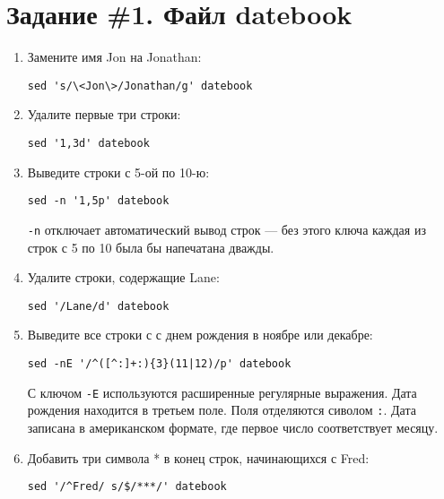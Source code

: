 \documentclass[listings]{labreport}
\begin{document}
\maketitlepage

\section*{Задание \#1. Файл datebook}

\begin{enumerate}
\item Замените имя Jon на Jonathan:
\begin{verbatim}
sed 's/\<Jon\>/Jonathan/g' datebook
\end{verbatim}

\item Удалите первые три строки:
\begin{verbatim}
sed '1,3d' datebook
\end{verbatim}

\item Выведите строки с 5-ой по 10-ю:
\begin{verbatim}
sed -n '1,5p' datebook
\end{verbatim}

\begin{small}
  \verb|-n| отключает автоматический вывод строк — без этого ключа каждая из строк с 5 по 10 была бы напечатана дважды.
\end{small}

\item Удалите строки, содержащие Lane:
\begin{verbatim}
sed '/Lane/d' datebook
\end{verbatim}

\item Выведите все строки с с днем рождения в ноябре или декабре:
\begin{verbatim}
sed -nE '/^([^:]+:){3}(11|12)/p' datebook
\end{verbatim}

\begin{small}
  С ключом \verb|-E| используются расширенные регулярные выражения.
  Дата рождения находится в третьем поле. Поля отделяются сиволом \texttt{:}.
  Дата записана в американском формате, где первое число соответствует месяцу.
\end{small}

\item Добавить три символа * в конец строк, начинающихся с Fred:
\begin{verbatim}
sed '/^Fred/ s/$/***/' datebook
\end{verbatim}


\end{enumerate}
\end{document}
